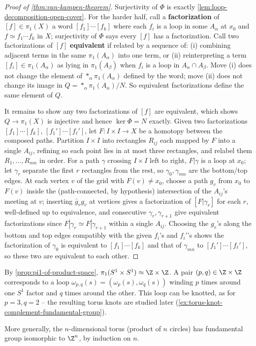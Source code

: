 \begin{proof}[Proof of \cref{thm:van-kampen-theorem}]
Surjectivity of $\Phi$ is exactly \cref{lem:loop-decomposition-open-cover}. For the
harder half, call a \textbf{factorization} of $[f]\in\pi_1(X)$ a word $[f_1]\cdots[f_k]$ where
each $f_i$ is a loop in some $A_\alpha$ at $x_0$ and $f \simeq f_1\cdots f_k$ in $X$; surjectivity of
$\Phi$ says every $[f]$ has a factorization. Call two factorizations of $[f]$
\textbf{equivalent} if related by a sequence of: (i) combining adjacent terms in the same
$\pi_1(A_\alpha)$ into one term, or (ii) reinterpreting a term $[f_i]\in\pi_1(A_\alpha)$ as lying in
$\pi_1(A_\beta)$ when $f_i$ is a loop in $A_\alpha\cap A_\beta$. Move (i) does not change the
element of $*_\alpha\pi_1(A_\alpha)$ defined by the word; move (ii) does not change its image in
$Q = *_\alpha\pi_1(A_\alpha)/N$. So equivalent factorizations define the same element of $Q$.

It remains to show any two factorizations of $[f]$ are equivalent, which shows
$Q \to \pi_1(X)$ is injective and hence $\ker\Phi = N$ exactly. Given two factorizations
$[f_1]\cdots[f_k]$, $[f_1']\cdots[f_\ell']$, let $F : I\times I \to X$ be a homotopy between the
composed paths. Partition $I\times I$ into rectangles $R_{ij}$ each mapped by $F$ into a
single $A_{ij}$, refining so each point lies in at most three rectangles, and relabel them
$R_1,\ldots,R_{mn}$ in order. For a path $\gamma$ crossing $I\times I$ left to right, $F|\gamma$ is a
loop at $x_0$; let $\gamma_r$ separate the first $r$ rectangles from the rest, so $\gamma_0,\gamma_{mn}$
are the bottom/top edges. At each vertex $v$ of the grid with $F(v)\ne x_0$, choose a
path $g_v$ from $x_0$ to $F(v)$ inside the (path-connected, by hypothesis) intersection
of the $A_{ij}$'s meeting at $v$; inserting $\bar g_vg_v$ at vertices gives a factorization of
$[F|\gamma_r]$ for each $r$, well-defined up to equivalence, and consecutive $\gamma_r,\gamma_{r+1}$
give equivalent factorizations since $F|\gamma_r \simeq F|\gamma_{r+1}$ within a single $A_{ij}$. Choosing
the $g_v$'s along the bottom and top edges compatibly with the given $f_i$'s and
$f_i'$'s shows the factorization of $\gamma_0$ is equivalent to $[f_1]\cdots[f_k]$ and that of
$\gamma_{mn}$ to $[f_1']\cdots[f_\ell']$, so these two are equivalent to each other.
\end{proof}

\begin{example}
\label{ex:torus-fundamental-group}


By \cref{prop:pi1-of-product-space}, $\pi_1(S^1\times S^1) \approx \Z\times\Z$. A pair
$(p,q) \in \Z\times\Z$ corresponds to a loop $\omega_{p,q}(s) = (\omega_p(s),\omega_q(s))$ winding $p$
times around one $S^1$ factor and $q$ times around the other. This loop can be
knotted, as for $p=3,q=2$ -- the resulting torus knots are studied later
(\cref{ex:torus-knot-complement-fundamental-group}).



More generally, the $n$-dimensional torus (product of $n$ circles) has fundamental
group isomorphic to $\Z^n$, by induction on $n$.
\end{example}
